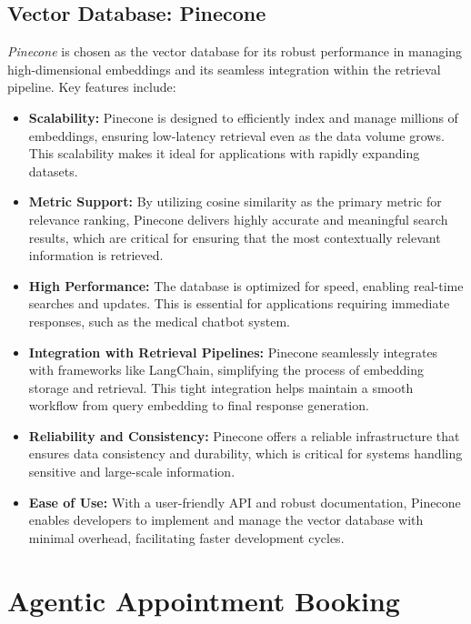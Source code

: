 \subsection{Vector Database: Pinecone}
\label{subsec:pinecone}
\emph{Pinecone} is chosen as the vector database for its robust performance in managing high-dimensional embeddings and its seamless integration within the retrieval pipeline. Key features include:
\begin{itemize}[itemsep=2em]
    \item \textbf{Scalability:} Pinecone is designed to efficiently index and manage millions of embeddings, ensuring low-latency retrieval even as the data volume grows. This scalability makes it ideal for applications with rapidly expanding datasets.
    \item \textbf{Metric Support:} By utilizing cosine similarity as the primary metric for relevance ranking, Pinecone delivers highly accurate and meaningful search results, which are critical for ensuring that the most contextually relevant information is retrieved.
    \item \textbf{High Performance:} The database is optimized for speed, enabling real-time searches and updates. This is essential for applications requiring immediate responses, such as the medical chatbot system.
    \item \textbf{Integration with Retrieval Pipelines:} Pinecone seamlessly integrates with frameworks like LangChain, simplifying the process of embedding storage and retrieval. This tight integration helps maintain a smooth workflow from query embedding to final response generation.
    \item \textbf{Reliability and Consistency:} Pinecone offers a reliable infrastructure that ensures data consistency and durability, which is critical for systems handling sensitive and large-scale information.
    \item \textbf{Ease of Use:} With a user-friendly API and robust documentation, Pinecone enables developers to implement and manage the vector database with minimal overhead, facilitating faster development cycles.
\end{itemize}


\section{Agentic Appointment Booking}
\label{sec:agentic_booking}

